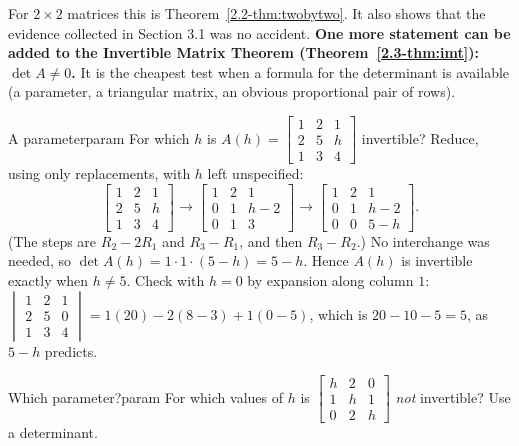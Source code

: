 \documentclass[11pt]{article}
\begin{document}
For $2\times2$ matrices this is Theorem~\ref{2.2-thm:twobytwo}. It also shows that the evidence collected in Section 3.1 was no accident. \textbf{One more statement can be added to the Invertible Matrix Theorem (Theorem~\ref{2.3-thm:imt}): $\det A\neq0$.} It is the cheapest test when a formula for the determinant is available (a parameter, a triangular matrix, an obvious proportional pair of rows).

\begin{exmp}{A parameter}{param}
For which $h$ is $A(h)=\begin{bmatrix}1&2&1\\2&5&h\\1&3&4\end{bmatrix}$ invertible? Reduce, using only replacements, with $h$ left unspecified:
\[
\begin{bmatrix}1&2&1\\2&5&h\\1&3&4\end{bmatrix}
\longrightarrow
\begin{bmatrix}1&2&1\\0&1&h-2\\0&1&3\end{bmatrix}
\longrightarrow
\begin{bmatrix}1&2&1\\0&1&h-2\\0&0&5-h\end{bmatrix}.
\]
(The steps are $R_2-2R_1$ and $R_3-R_1$, and then $R_3-R_2$.) No interchange was needed, so $\det A(h)=1\cdot1\cdot(5-h)=5-h$. Hence $A(h)$ is invertible exactly when $h\neq5$. Check with $h=0$ by expansion along column $1$: $\begin{vmatrix}1&2&1\\2&5&0\\1&3&4\end{vmatrix}=1(20)-2(8-3)+1(0-5)$, which is $20-10-5=5$, as $5-h$ predicts.
\end{exmp}

\begin{kc}{Which parameter?}{param}
For which values of $h$ is $\begin{bmatrix}h&2&0\\1&h&1\\0&2&h\end{bmatrix}$ \emph{not} invertible? Use a determinant.
\end{kc}
\end{document}
